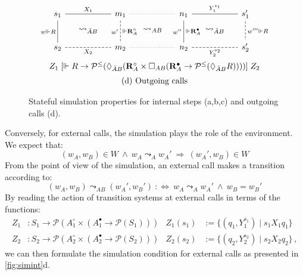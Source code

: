 \documentclass[acmsmall,screen,review,anonymous]{acmart}
\newcommand{\que}{\circ}
\newcommand{\ans}{\bullet}
\begin{document}
\begin{figure}
\[\begin{array}{c}
      \begin{tikzcd}[sep=tiny, column sep=small]
        s_1 \ar[rr, "X_1", dash] \ar[dd, "w \Vdash R"', dash] &&
        m_1 \ar[rr, dotted, dash] \ar[dd, "w'"', "{} \Vdash \mathbf{R}_A^\que", dash, dashed] &&
        n_1 \ar[rr, "Y_1^{s_1}", dash] \ar[dd, "w''"', "{} \Vdash \mathbf{R}_A^\ans", dash] &&
        s_1' \ar[dd, "w''' \Vdash R", dash, dashed]
        \\
        & \leadsto_{\bar{A}B} && \leadsto_{AB} && \leadsto_{\bar{A}B} &
        \\
        s_2 \ar[rr, "X_2"', dash, dashed] &&
        m_2 \ar[rr, dotted, dash] &&
        n_2 \ar[rr, "Y_2^{s_2}"', dash, dashed] &&
        s_2'
      \end{tikzcd}
      \vspace{1ex} \\
      Z_1
      \mathrel{[
        \Vdash R \rightarrow \mathcal{P}^\le(
          \Diamond_{\bar{A}B} (
          \mathbf{R}_A^\que \times
            \Box_{AB} (
            \mathbf{R}_A^\ans \rightarrow
            \mathcal{P}^\le(\Diamond_{\bar{A}B} R))))
      ]}
      Z_2
      \vspace{1.3ex} \\
      \text{(d) Outgoing calls}
    \end{array}
  \]

  \caption{Stateful simulation properties for internal steps (a,b,c)
    and outgoing calls (d).}
  \label{fig:simint}
\end{figure}

Conversely, for external calls,
the simulation plays the role of the environment.
We expect that:
\[
  (w_A, w_B) \in W \:\wedge\:
  w_A \leadsto_A w_A' \:\Rightarrow\:
  (w_A', w_B) \in W
\]
From the point of view of the simulation,
an external call makes a transition according to:
\[
  (w_A, w_B) \leadsto_{AB} (w_A', w_B') \::\Leftrightarrow\:
  w_A \leadsto_A w_A' \:\wedge\:
  w_B = w_B'
\]
By reading the action of transition systems at external calls
in terms of the functions:
\begin{align*}
  Z_1 &: S_1 \rightarrow
    \mathcal{P}(A_1^\que \times (A_1^\ans \rightarrow \mathcal{P}(S_1))) &
  Z_1(s_1) &:= \{ (q_1, Y_1^{s_1}) \mid s_1 \mathrel{X_1} q_1 \}
 \\
  Z_2 &: S_2 \rightarrow
    \mathcal{P}(A_2^\que \times (A_2^\ans \rightarrow \mathcal{P}(S_2))) &
  Z_2(s_2) &:= \{ (q_2, Y_2^{s_2}) \mid s_2 \mathrel{X_2} q_2 \}
  \,,
\end{align*}
we can then formulate the simulation condition for external calls
as presented in \autoref{fig:simint}d.
\end{document}
